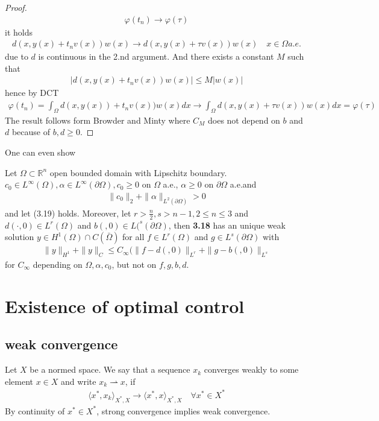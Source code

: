 \begin{proof}
	\begin{align*}
		\varphi(t_n) \rightarrow \varphi(\tau)
	\end{align*}
	it holds
	\begin{align*}
		d(x, y(x) + t_n v(x)) w(x) \rightarrow d(x, y(x)+ \tau v(x))w(x) \quad x \in \Omega a.e.
	\end{align*}
	due to $d$ is continuous in the 2.nd argument. And there exists a constant $M$ such that
	\begin{align*}
		|d(x, y(x) + t_n v(x))w(x) | \le M |w(x)|
	\end{align*}
	hence by DCT
	\begin{align*}
		\varphi(t_n) = \int_\Omega d(x, y(x)) + t_n v(x)) w(x) dx \rightarrow 
		\int_\Omega d(x, y(x) + \tau v(x) )w(x) dx = \varphi(\tau)
	\end{align*}
	The result follows form Browder and Minty where $C_M$ does not depend on $b$ and $d$ because of $b, d \geq 0$. 
\end{proof}

One can even show 
\begin{theorem}
	Let $\Omega \subset \mathbb{R}^n$ open bounded domain with Lipschitz boundary. $ c_0 \in L^\infty(\Omega), \alpha \in L^\infty(\partial \Omega), c_0 \geq 0$ on $\Omega$ a.e., $\alpha \geq 0$ on $\partial \Omega$ a.e.and 
	\begin{align*}
		\|c_0\|_2 + \|\alpha \|_{L^2(\partial \Omega)} > 0
	\end{align*}
	and let (3.19) holds. Moreover, let $r > \frac{n}{2}, s > n - 1, 2 \le n \le 3$ and $d(\cdot, 0) \in L^r(\Omega)$ and $b(, 0) \in L(^s(\partial \Omega)$, then \textbf{3.18} has an unique weak solution $y \in H^1(\Omega) \cap C(\bar{\Omega})$ for all $f \in L^r(\Omega)$ and $g \in L^s(\partial \Omega)$ with
	\begin{align*}
		\|y\|_{H^1} + \|y\|_{C} \le C_\infty (\|f - d(, 0)\|_{L^r} + \|g - b(, 0)\|_{L^s}
	\end{align*}
	for $C_\infty$ depending on $\Omega, \alpha, c_0$, but not on $f, g, b, d$. 
\end{theorem}


\newpage
\section{Existence of optimal control}
\subsection{weak convergence}
Let $X$ be a normed space. We say that a sequence $x_k$ converges weakly to some element $x \in X$ and write $x_k \rightharpoonup x$, if
\begin{align*}
	\langle x^*, x_k \rangle_{X^*, X} \rightarrow \langle x^*, x\rangle_{X^*, X} \quad \forall x^* \in X^*
\end{align*}
By continuity of $x^* \in X^*$, strong convergence implies weak convergence. 

